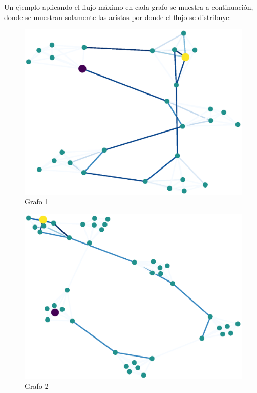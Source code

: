 \documentclass{article}
\begin{document}
Un ejemplo aplicando el flujo máximo en cada grafo se muestra a continuación, donde se muestran solamente las aristas por donde el flujo se distribuye:
\begin{figure}[H]
    \includegraphics[width=\textwidth]{res-1}
    \caption{Grafo 1}
    \label{fig:matriz}
\end{figure}
\begin{figure}[H]
    \includegraphics[width=\textwidth]{res-2}
    \caption{Grafo 2}
    \label{fig:matriz}
\end{figure}
\end{document}
